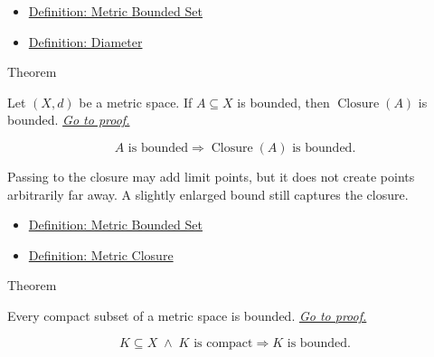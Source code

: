 \begin{dependencies}
\begin{itemize}
  \item \hyperref[def:metric-bounded-set]{Definition: Metric Bounded Set}
  \item \hyperref[def:metric-diameter]{Definition: Diameter}
\end{itemize}
\end{dependencies}

\begin{theorembox}{Theorem}
\begin{theorem}
\label{thm:metric-closure-bounded-set-bounded}
Let \((X,d)\) be a metric space.  If \(A\subseteq X\) is bounded, then
\(\operatorname{Closure}(A)\) is bounded.
\hyperref[prf:metric-closure-bounded-set-bounded]{\textit{Go to proof.}}
\end{theorem}
\end{theorembox}

\begin{remark*}
\[
A\text{ is bounded}
\Longrightarrow
\operatorname{Closure}(A)\text{ is bounded}.
\]
\end{remark*}

\begin{remark*}[Interpretation]
Passing to the closure may add limit points, but it does not create points
arbitrarily far away.  A slightly enlarged bound still captures the closure.
\end{remark*}

\begin{dependencies}
\begin{itemize}
  \item \hyperref[def:metric-bounded-set]{Definition: Metric Bounded Set}
  \item \hyperref[def:metric-closure]{Definition: Metric Closure}
\end{itemize}
\end{dependencies}

\begin{theorembox}{Theorem}
\begin{theorem}\label{thm:metric-compact-sets-bounded}
Every compact subset of a metric space is bounded.
\hyperref[prf:metric-compact-sets-bounded]{\textit{Go to proof.}}
\end{theorem}
\end{theorembox}

\begin{remark*}
\[
K\subseteq X
\;\land\;
K\text{ is compact}
\Longrightarrow
K\text{ is bounded}.
\]
\end{remark*}

